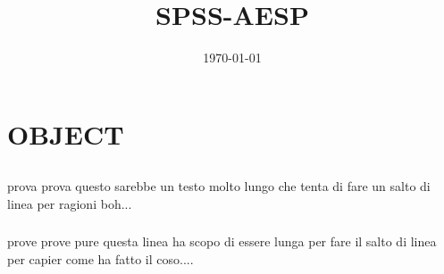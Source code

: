 \documentclass[11pt]{article} %
\title{SPSS-AESP}
\author{\autori}
\date{\today}
\let\Oldsection\section
\renewcommand{\section}[1]{\leftskip 0pt \Oldsection{#1}}
\let\Oldsubsection\subsection
\renewcommand{\subsection}[1]{\leftskip \parindent \Oldsubsection{#1}}
\let\Oldsubsubsection\subsubsection
\renewcommand{\subsubsection}[1]{\leftskip 2\parindent \Oldsubsubsection{#1}}
\begin{document}
	\maketitle
\pagebreak


\section{OBJECT}

\subsection{} 

prova prova questo sarebbe un testo molto lungo che tenta di fare un salto di linea per ragioni boh...

\subsubsection{} 

prove prove pure questa linea ha scopo di essere lunga per fare il salto di linea per capier come ha fatto il coso....






\label{last page}



%
%
%
\end{document}
